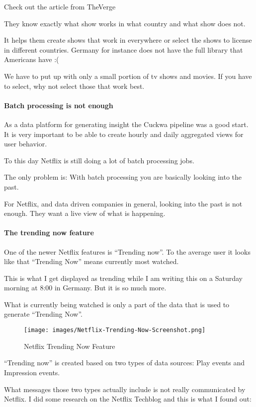 \documentclass[12pt, numbers=noenddot]{scrreprt} %
\begin{document}
Check out the article from TheVerge

They know exactly what show works in what country and what show does not.

It helps them create shows that work in everywhere or select the shows to license in different countries. Germany for instance does not have the full library that Americans have :(

We have to put up with only a small portion of tv shows and movies. If you have to select, why not select those that work best.

\paragraph{Batch processing is not enough}

As a data platform for generating insight the Cuckwa pipeline was a good start. It is very important to be able to create hourly and daily aggregated views for user behavior.

To this day Netflix is still doing a lot of batch processing jobs.

The only problem is: With batch processing you are basically looking into the past.

For Netflix, and data driven companies in general, looking into the past is not enough. They want a live view of what is happening.

\paragraph{The trending now feature}
One of the newer Netflix features is “Trending now”. To the average user it looks like that “Trending Now” means currently most watched.

This is what I get displayed as trending while I am writing this on a Saturday morning at 8:00 in Germany. But it is so much more.

What is currently being watched is only a part of the data that is used to generate “Trending Now”.

\begin{figure}[htbp]
  \centering
     \texttt{[image: images/Netflix-Trending-Now-Screenshot.png]}
  \caption{Netflix Trending Now Feature}
  \label{fig:Bild1}
\end{figure}

“Trending now” is created based on two types of data sources: Play events and Impression events.

What messages those two types actually include is not really communicated by Netflix. I did some research on the Netflix Techblog and this is what I found out:
\end{document}
